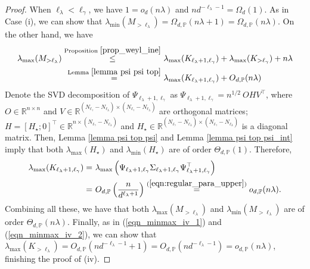 \documentclass{article}
\theoremstyle{plain}
\theoremstyle{definition}
\theoremstyle{remark}
\newcommand{\dhnote}[1]{{\color{red}[#1]} } %
\begin{document}
\begin{appendix}
\begin{proof}

 When $\ell_{\lambda}<\ell_{\gamma}$, we have $
1 = o_d(n\lambda)$ and $nd^{-\ell_{\lambda}-1}=\Omega_d(1)$.
As in Case (i), we can show that $\lambda_{\text{min}}(M_{>\ell_{\lambda}}) = \Omega_{d, \mathbb{P}}(n\lambda+1) = \Omega_{d, \mathbb{P}}(n\lambda)$. On the other hand, we have
\begin{equation}\label{eqn_minmax_iv_1}
    \begin{aligned}
        \lambda_{\text{max}}(M_{>\ell_{\lambda}})
        \overset{\text{Proposition } \ref{prop_weyl_ine}}{\leq} &~
        \lambda_{\text{max}}(K_{\ell_{\lambda}+1, \ell_{\gamma}}) +
        \lambda_{\text{max}}(K_{>\ell_{\gamma}}) + n\lambda\\
        \overset{\text{Lemma } \ref{lemma psi psi top}}{=}&~
        \lambda_{\text{max}}(K_{\ell_{\lambda}+1, \ell_{\gamma}}) +
        O_{d, \mathbb{P}}(n\lambda)\\
    \end{aligned}
\end{equation}
 Denote the SVD decomposition of $ \Psi_{\ell_{\lambda}+1, \ell_{\gamma}} $ as $ \Psi_{\ell_{\lambda}+1, \ell_{\gamma}} = n^{1/2} ~ O H V^{\top} $, where $ O \in \mathbb{R}^{n \times n}$ and $ V \in \mathbb{R}^{(N_{\ell_{\gamma}}-N_{\ell_{\lambda}}) \times (N_{\ell_{\gamma}}-N_{\ell_{\lambda}})}$ are orthogonal matrices; $H = \left[ H_{\star}; 0 \right]^{\top} \in \mathbb{R}^{n \times (N_{\ell_{\gamma}}-N_{\ell_{\lambda}})} $ and $H_{\star} \in \mathbb{R}^{(N_{\ell_{\gamma}}-N_{\ell_{\lambda}}) \times (N_{\ell_{\gamma}}-N_{\ell_{\lambda}})} $ is a diagonal matrix. 
 Then, Lemma \ref{lemma psi top psi} and Lemma \ref{lemma psi top psi_int} imply that both $\lambda_{\text{max}}\left(H_{\star}\right)$ and $  \lambda_{\text{min}}\left(H_{\star}\right)$ are of order $\Theta_{d, \mathbb{P}}(1)$. Therefore, 
\begin{equation}\label{eqn_minmax_iv_2}
    \begin{aligned}
        \lambda_{\text{max}}(K_{\ell_{\lambda}+1, \ell_{\gamma}})
        =&~
        \lambda_{\text{max}}\left(\Psi_{\ell_{\lambda}+1, \ell_{\gamma}} \Sigma_{\ell_{\lambda}+1, \ell_{\gamma}} \Psi_{\ell_{\lambda}+1, \ell_{\gamma}}^{\top}\right)\\
         = &~
         O_{d, \mathbb{P}}\left(\frac{n}{d^{\ell_{\lambda}+1}}\right) \overset{(\ref{eqn:regular_para_upper})}{=} o_{d, \mathbb{P}}(n\lambda).
    \end{aligned}
\end{equation}
Combining all these, we have that both $\lambda_{\text{max}}(M_{>\ell_{\lambda}})$ and $ \lambda_{\text{min}}(M_{>\ell_{\lambda}})$ are of order $\Theta_{d, \mathbb{P}}(n\lambda)$.
Finally, as in (\ref{eqn_minmax_iv_1}) and (\ref{eqn_minmax_iv_2}), we can show that $\lambda_{\text{max}}(K_{>\ell_{\lambda}}) = O_{d, \mathbb{P}}(nd^{-\ell_{\lambda}-1}+ 1)=O_{d, \mathbb{P}}(nd^{-\ell_{\lambda}-1})=o_{d, \mathbb{P}}(n\lambda)$, finishing the proof of (iv).





\end{proof}
\end{appendix}
\end{document}

